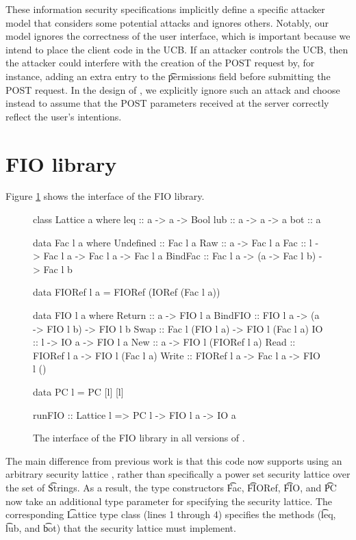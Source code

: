 \begin{refsection}
These information security specifications implicitly define a specific attacker model that considers some potential attacks and ignores others.
%
Notably, our model ignores the correctness of the user interface,
which is important because we intend to place the client code in the UCB.
%
If an attacker controls the UCB,
then the attacker could interfere with the creation of the POST request by,
for instance, adding an extra entry to the \t{permissions} field before submitting the POST request.
%
In the design of \myapp{},
we explicitly ignore such an attack and choose instead to assume that the POST parameters received at the server correctly reflect the user's intentions.

\section{FIO library}

Figure \ref{code_fio} shows the interface of the FIO library.
\begin{figure}
\begin{fbstart}
class Lattice a where
  leq :: a -> a -> Bool
  lub :: a -> a -> a
  bot :: a

data Fac l a where
  Undefined :: Fac l a
  Raw       :: a -> Fac l a
  Fac       :: l -> Fac l a -> Fac l a -> Fac l a
  BindFac   :: Fac l a -> (a -> Fac l b) -> Fac l b

data FIORef l a = FIORef (IORef (Fac l a))

data FIO l a where
  Return  :: a -> FIO l a
  BindFIO :: FIO l a -> (a -> FIO l b) -> FIO l b
  Swap    :: Fac l (FIO l a) -> FIO l (Fac l a)
  IO      :: l -> IO a -> FIO l a
  New     :: a -> FIO l (FIORef l a)
  Read    :: FIORef l a -> FIO l (Fac l a)
  Write   :: FIORef l a -> Fac l a -> FIO l ()

data PC l = PC [l] [l]

runFIO :: Lattice l => PC l -> FIO l a -> IO a
\end{fbstart}
\caption{The interface of the FIO library in all versions of \myapp{}.}
\label{code_fio}
\end{figure}
The main difference from previous work \cite{bimonadic} is that this code now supports using an arbitrary security lattice \cite{ngo2018better},
rather than specifically a power set security lattice over the set of \t{String}s.
%
As a result,
the type constructors \t{Fac}, \t{FIORef}, \t{FIO}, and \t{PC} now take an additional type parameter for specifying the security lattice.
%
The corresponding \t{Lattice} type class (lines 1 through 4)
specifies the methods (\t{leq}, \t{lub}, and \t{bot}) that the security lattice must implement.


\end{refsection}
